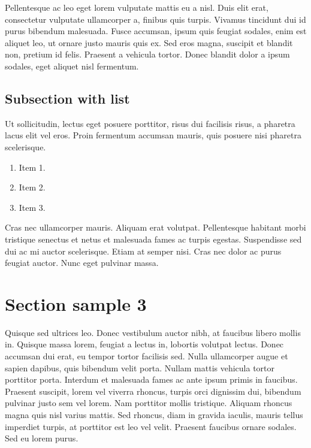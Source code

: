 Pellentesque ac leo eget lorem vulputate mattis eu a nisl. Duis elit erat, consectetur vulputate ullamcorper a, finibus quis turpis. Vivamus tincidunt dui id purus bibendum malesuada. Fusce accumsan, ipsum quis feugiat sodales, enim est aliquet leo, ut ornare justo mauris quis ex. Sed eros magna, suscipit et blandit non, pretium id felis. Praesent a vehicula tortor. Donec blandit dolor a ipsum sodales, eget aliquet nisl fermentum.

\subsection{Subsection with list}

Ut sollicitudin, lectus eget posuere porttitor, risus dui facilisis risus, a pharetra lacus elit vel eros. Proin fermentum accumsan mauris, quis posuere nisi pharetra scelerisque. 
\begin{enumerate}
  \item Item 1.
  \item Item 2.
  \item Item 3.
\end{enumerate}

Cras nec ullamcorper mauris. Aliquam erat volutpat. Pellentesque habitant morbi tristique senectus et netus et malesuada fames ac turpis egestas. Suspendisse sed dui ac mi auctor scelerisque. Etiam at semper nisi. Cras nec dolor ac purus feugiat auctor. Nunc eget pulvinar massa.

%

\section{Section sample 3}

Quisque sed ultrices leo. Donec vestibulum auctor nibh, at faucibus libero mollis in. Quisque massa lorem, feugiat a lectus in, lobortis volutpat lectus. Donec accumsan dui erat, eu tempor tortor facilisis sed. Nulla ullamcorper augue et sapien dapibus, quis bibendum velit porta. Nullam mattis vehicula tortor porttitor porta. Interdum et malesuada fames ac ante ipsum primis in faucibus. Praesent suscipit, lorem vel viverra rhoncus, turpis orci dignissim dui, bibendum pulvinar justo sem vel lorem. Nam porttitor mollis tristique. Aliquam rhoncus magna quis nisl varius mattis. Sed rhoncus, diam in gravida iaculis, mauris tellus imperdiet turpis, at porttitor est leo vel velit. Praesent faucibus ornare sodales. Sed eu lorem purus.  

